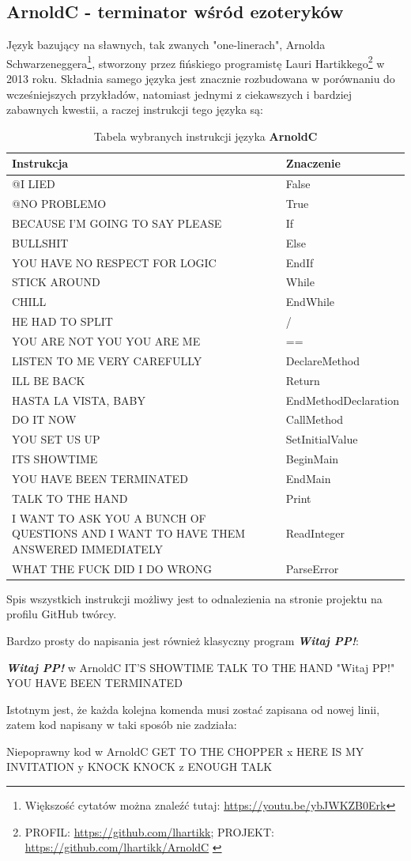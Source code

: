 \documentclass[fleqn,10pt]{SelfArx} %
\newcommand{\tabline}{\tabularnewline\hline}
\begin{document}
\subsection{ArnoldC - terminator wśród ezoteryków}
Język bazujący na sławnych, tak zwanych "one-linerach", Arnolda Schwarzeneggera\footnote{Większość cytatów można znaleźć tutaj: \url{https://youtu.be/ybJWKZB0Erk}}, stworzony przez fińskiego programistę Lauri Hartikkego\footnote{PROFIL: \url{https://github.com/lhartikk}; PROJEKT: \url{https://github.com/lhartikk/ArnoldC} \label{ArnoldSource}} 
w 2013 roku. Składnia samego języka jest znacznie rozbudowana w porównaniu do wcześniejszych przykładów, natomiast jednymi z ciekawszych i bardziej zabawnych kwestii, 
a raczej instrukcji tego języka są:
\begin{table}[H]
	\begin{center}
		\begin{tabular}{| >{\centering}p{4.3cm} | >{\centering}p{3.2cm} |}
			\hline
			\textbf{Instrukcja} & \textbf{Znaczenie} \tabline
			@I LIED & False \tabline
			@NO PROBLEMO & True \tabline
			BECAUSE I'M GOING TO SAY PLEASE & If \tabline
			BULLSHIT & Else \tabline
			YOU HAVE NO RESPECT FOR LOGIC & EndIf \tabline
			STICK AROUND & While \tabline
			CHILL & EndWhile \tabline
			HE HAD TO SPLIT & / \tabline
			YOU ARE NOT YOU YOU ARE ME & == \tabline
			LISTEN TO ME VERY CAREFULLY & DeclareMethod \tabline
			I\textquotesingle LL BE BACK & Return \tabline
			HASTA LA VISTA, BABY & EndMethodDeclaration \tabline
			DO IT NOW & CallMethod \tabline
			YOU SET US UP & SetInitialValue \tabline
			IT\textquotesingle S SHOWTIME & BeginMain \tabline
			YOU HAVE BEEN TERMINATED & EndMain \tabline
			TALK TO THE HAND & Print \tabline
			I WANT TO ASK YOU A BUNCH OF QUESTIONS AND I WANT TO HAVE THEM ANSWERED IMMEDIATELY & ReadInteger \tabline
			WHAT THE FUCK DID I DO WRONG & ParseError \tabline
		\end{tabular}
	\end{center}
	\caption{\centering Tabela wybranych instrukcji języka \textbf{ArnoldC}}
	\label{tab:arnoldC!instrukcje}
\end{table}
Spis wszystkich instrukcji możliwy jest to odnalezienia na stronie projektu na profilu GitHub twórcy.
\par Bardzo prosty do napisania jest również klasyczny program \textbf{\textit{Witaj PP!}}:
\begin{sexylisting}{\textbf{\textit{Witaj PP!}} w ArnoldC}
IT'S SHOWTIME
TALK TO THE HAND "Witaj PP!"
YOU HAVE BEEN TERMINATED
\end{sexylisting}
Istotnym jest, że każda kolejna komenda musi zostać zapisana od nowej linii, zatem kod napisany w taki sposób nie zadziała\cite{esolangWiki:arnoldC}:
\begin{sexylisting}{Niepoprawny kod w ArnoldC}
GET TO THE CHOPPER x HERE IS MY INVITATION y KNOCK KNOCK z ENOUGH TALK
\end{sexylisting}
\end{document}
